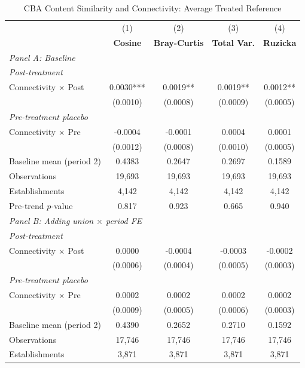 \begin{table}[H]
\centering
\caption{CBA Content Similarity and Connectivity: Average Treated Reference}
\scriptsize
\setlength{\tabcolsep}{8pt}
\begin{tabular}{lcccc}
\hline\hline
 & (1) & (2) & (3) & (4) \\
 & \textbf{Cosine} & \textbf{Bray-Curtis} & \textbf{Total Var.} & \textbf{Ruzicka} \\
\hline
\multicolumn{5}{l}{\textit{Panel A: Baseline}} \\
\multicolumn{5}{l}{\textit{Post-treatment}} \\
Connectivity $\times$ Post & 0.0030*** & 0.0019** & 0.0019** & 0.0012** \\
 & (0.0010) & (0.0008) & (0.0009) & (0.0005) \\
\multicolumn{5}{l}{\textit{Pre-treatment placebo}} \\
Connectivity $\times$ Pre & -0.0004 & -0.0001 & 0.0004 & 0.0001 \\
 & (0.0012) & (0.0008) & (0.0010) & (0.0005) \\
\hline
Baseline mean (period 2) & 0.4383 & 0.2647 & 0.2697 & 0.1589 \\
Observations &       19,693 &       19,693 &       19,693 &       19,693 \\
Establishments &        4,142 &        4,142 &        4,142 &        4,142 \\
Pre-trend $p$-value & 0.817 & 0.923 & 0.665 & 0.940 \\
\hline
\multicolumn{5}{l}{\textit{Panel B: Adding union $\times$ period FE}} \\
\multicolumn{5}{l}{\textit{Post-treatment}} \\
Connectivity $\times$ Post & 0.0000 & -0.0004 & -0.0003 & -0.0002 \\
 & (0.0006) & (0.0004) & (0.0005) & (0.0003) \\
\multicolumn{5}{l}{\textit{Pre-treatment placebo}} \\
Connectivity $\times$ Pre & 0.0002 & 0.0002 & 0.0002 & 0.0002 \\
 & (0.0009) & (0.0005) & (0.0006) & (0.0003) \\
\hline
Baseline mean (period 2) & 0.4390 & 0.2652 & 0.2710 & 0.1592 \\
Observations &       17,746 &       17,746 &       17,746 &       17,746 \\
Establishments &        3,871 &        3,871 &        3,871 &        3,871 \\

\end{tabular}
\end{table}
